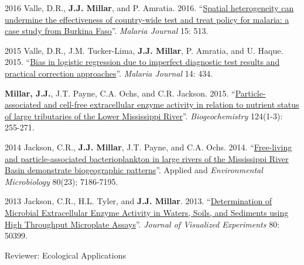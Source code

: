 \begin{cvskills}

\cvskill
    {2016} %
    {Valle, D.R., \textbf{J.J. Millar}, and P. Amratia. 2016. “\href{https://malariajournal.biomedcentral.com/articles/10.1186/s12936-016-1565-2}{Spatial heterogeneity can undermine the effectiveness of country-wide test and treat policy for malaria: a case study from Burkina Faso}”. \textit{Malaria Journal} 15: 513.} 


\cvskill
    {2015} %
    {Valle, D.R., J.M. Tucker-Lima, \textbf{J.J. Millar}, P. Amratia, and U. Haque. 2015. “\href{https://malariajournal.biomedcentral.com/articles/10.1186/s12936-015-0966-y}{Bias in logistic regression due to imperfect diagnostic test results and practical correction approaches}”. \textit{Malaria Journal} 14: 434.
    } 
    
\cvskill
    {} %
    {\textbf{Millar, J.J.}, J.T. Payne, C.A. Ochs, and C.R. Jackson. 2015. “\href{http://aem.asm.org/content/early/2014/09/08/AEM.01844-14}{Particle-associated and cell-free extracellular enzyme activity in relation to nutrient status of large tributaries of the Lower Mississippi River}”. \textit{Biogeochemistry} 124(1-3): 255-271.
    } 

\cvskill
    {2014} %
    {Jackson, C.R., \textbf{J.J. Millar}, J.T. Payne, and C.A. Ochs. 2014. “\href{http://aem.asm.org/content/early/2014/09/08/AEM.01844-14}{Free-living and particle-associated bacterioplankton in large rivers of the Mississippi River Basin demonstrate biogeographic patterns}”. Applied and \textit{Environmental Microbiology} 80(23); 7186-7195.
    } 

\cvskill
    {2013} %
    {Jackson, C.R., H.L. Tyler, and \textbf{J.J. Millar}. 2013. “\href{https://www.jove.com/video/50399/determination-microbial-extracellular-enzyme-activity-waters-soils}{Determination of Microbial Extracellular Enzyme Activity in Waters, Soils, and Sediments using High Throughput Microplate Assays}”. \textit{Journal of Visualized Experiments} 80: 50399.
    } 




\end{cvskills}

{Reviewer: Ecological Applications}
\\
\\